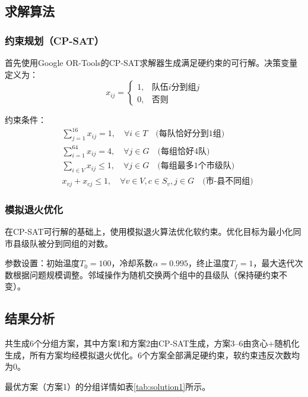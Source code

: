 \documentclass[a4paper,12pt]{article}
\begin{document}
\subsection{求解算法}

\subsubsection{约束规划（CP-SAT）}
首先使用Google OR-Tools的CP-SAT求解器生成满足硬约束的可行解。决策变量定义为：
\[
x_{ij} = \begin{cases} 1, & \text{队伍}i\text{分到组}j \\ 0, & \text{否则} \end{cases}
\]

约束条件：
\begin{align}
& \sum_{j=1}^{16} x_{ij} = 1, \quad \forall i \in T \quad \text{(每队恰好分到1组)} \\
& \sum_{i=1}^{64} x_{ij} = 4, \quad \forall j \in G \quad \text{(每组恰好4队)} \\
& \sum_{i \in V} x_{ij} \leq 1, \quad \forall j \in G \quad \text{(每组最多1个市级队)} \\
& x_{vj} + x_{cj} \leq 1, \quad \forall v \in V, c \in S_v, j \in G \quad \text{(市-县不同组)}
\end{align}

\subsubsection{模拟退火优化}
在CP-SAT可行解的基础上，使用模拟退火算法优化软约束。优化目标为最小化同市县级队被分到同组的对数。

参数设置：初始温度$T_0=100$，冷却系数$\alpha=0.995$，终止温度$T_f=1$，最大迭代次数根据问题规模调整。邻域操作为随机交换两个组中的县级队（保持硬约束不变）。

\subsection{结果分析}
共生成6个分组方案，其中方案1和方案2由CP-SAT生成，方案3--6由贪心+随机化生成，所有方案均经模拟退火优化。6个方案全部满足硬约束，软约束违反次数均为0。

最优方案（方案1）的分组详情如表\ref{tab:solution1}所示。
\end{document}
